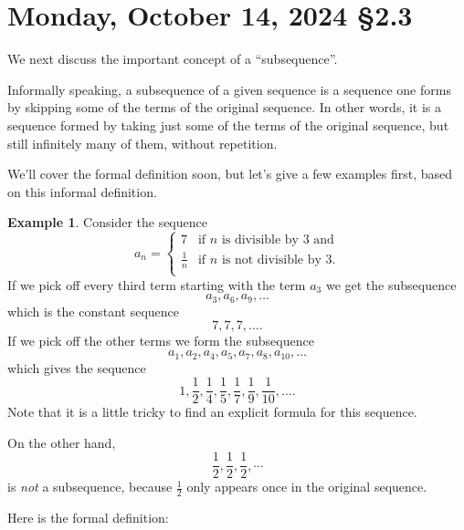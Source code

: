 \documentclass[12pt]{amsart}
\def\Mo{Monday}
\numberwithin{equation}{section}
\theoremstyle{plain} %
\newcommand{\Oct}[3]{\section{#2, October #1, 2024 \quad \S#3}}
\theoremstyle{definition}
\newtheorem{ex}[equation]{Example}
\theoremstyle{remark}
\begin{document}
\newpage




\Oct{14}{\Mo}{2.3}

We next discuss the important concept of a ``subsequence''. 

Informally speaking, a subsequence of a given sequence is a sequence one forms by skipping some of the 
terms of the original sequence. In other words, it is a sequence formed by taking just some of the terms of the original
sequence, but still infinitely many of them,   
without repetition. 

We'll cover the formal definition soon, but let's give a few examples first, based on this informal definition. 

\begin{ex}
Consider the sequence
$$
a_n = 
\begin{cases}
7 &  \text{if $n$ is divisible by $3$ and} \\
\frac{1}{n} &  \text{if $n$ is not divisible by $3$}. \\
\end{cases}
$$ If we pick off every third term starting with the term $a_3$ we get the subsequence
$$
a_3, a_6, a_9, \dots
$$
which is the constant sequence
$$
7,7,7, \dots.
$$
If we pick off the other terms we form the subsequence
$$
a_1, a_2, a_4, a_5, a_7, a_8, a_{10}, \dots
$$
which gives the sequence
$$
1, \frac12, \frac14, \frac15, \frac17, \frac19, \frac1{10}, \dots.
$$
Note that it is a little tricky to find an explicit formula for this sequence.

On the other hand,
\[ \frac12, \frac12,\frac12, \cdots\]
is \emph{not} a subsequence, because $\frac12$ only appears once in the original sequence.
\end{ex}


Here is the formal definition:
\end{document}
